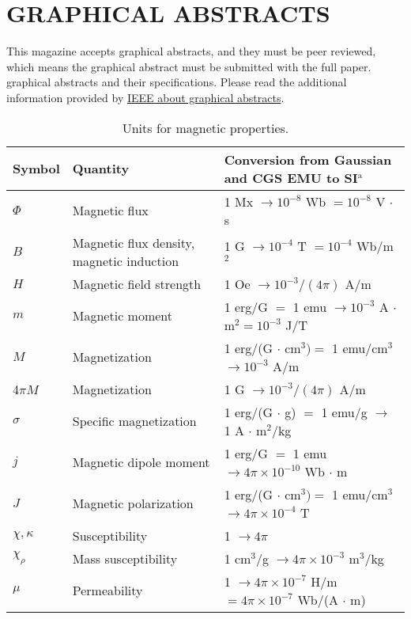 \documentclass{IEEEmce}
\begin{document}
\section{GRAPHICAL ABSTRACTS}

This magazine accepts graphical abstracts, and they must be peer reviewed, which means the graphical abstract must be submitted with the full paper. graphical abstracts and their specifications. Please read the additional information provided by \href{http://www.ieee.org/publications_standards/publications/graphical_abstract.pdf}{{IEEE about graphical abstracts}}.\enlargethispage{7pt}



\begin{table*}
\normalsize
\begin{center}
\caption{Units for magnetic properties.}
\label{table}
\begin{tabular*}{29.7pc}{@{}|p{29pt}|p{90pt}<{\raggedright}|p{200pt}<{\raggedright}|@{}}
\hline
Symbol& 
Quantity& 
Conversion from Gaussian and CGS EMU to SI$^{\mathrm{a}}$ \\
\hline
$\Phi $& 
Magnetic flux& 
1 Mx $\to 10^{-8}$ Wb $= 10^{-8}$ V $\cdot$ s \\
$B$& 
Magnetic flux density, magnetic induction& 
1 G $\to 10^{-4}$ T $= 10^{-4}$ Wb/m$^{2}$ \\
$H$& 
Magnetic field strength& 
1 Oe $\to 10^{-3}/(4\pi )$ A/m \\
$m$& 
Magnetic moment& 
1 erg/G $=$ 1 emu $\to 10^{-3}$ A $\cdot$ m$^{2} = 10^{-3}$ J/T \\
$M$& 
Magnetization& 
1 erg/(G $\cdot$ cm$^{3}) =$ 1 emu/cm$^{3}$ $\to 10^{-3}$ A/m \\
4$\pi M$& 
Magnetization& 
1 G $\to 10^{-3}/(4\pi )$ A/m \\
$\sigma $& 
Specific magnetization& 
1 erg/(G $\cdot$ g) $=$ 1 emu/g $\to $ 1 A $\cdot$ m$^{2}$/kg \\
$j$& 
Magnetic dipole moment& 
1 erg/G $=$ 1 emu $\to 4\pi \times 10^{-10}$ Wb $\cdot$ m \\
$J$& 
Magnetic polarization& 
1 erg/(G $\cdot$ cm$^{3}) =$ 1 emu/cm$^{3}$ $\to 4\pi \times 10^{-4}$ T \\
$\chi , \kappa $& 
Susceptibility& 
1 $\to 4\pi $ \\
$\chi_{\rho }$& 
Mass susceptibility& 
1 cm$^{3}$/g $\to 4\pi \times 10^{-3}$ m$^{3}$/kg \\
$\mu $& 
Permeability& 
1 $\to 4\pi \times 10^{-7}$ H/m $= 4\pi \times 10^{-7}$ Wb/(A $\cdot$ m) \\

\end{tabular*}
\end{center}
\end{table*}
\end{document}
